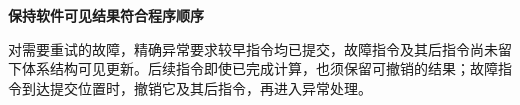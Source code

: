 {\color{ink}\bfseries 保持软件可见结果符合程序顺序}\par\vspace{1bp}对需要重试的故障，精确异常要求较早指令均已提交，故障指令及其后指令尚未留下体系结构可见更新。后续指令即使已完成计算，也须保留可撤销的结果；故障指令到达提交位置时，撤销它及其后指令，再进入异常处理。
